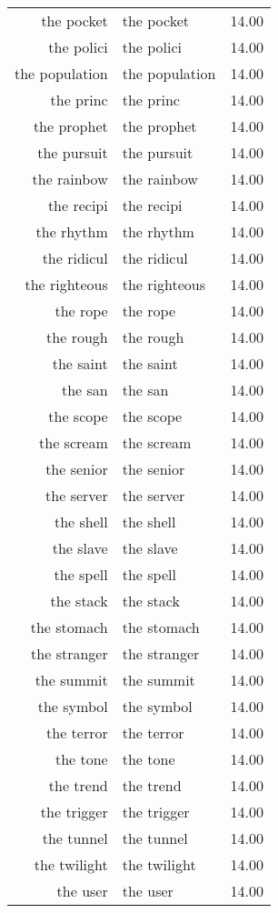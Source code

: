 \begin{table}[ht]
\begin{tabular}{rlr}
  the pocket & the pocket & 14.00 \\ 
  the polici & the polici & 14.00 \\ 
  the population & the population & 14.00 \\ 
  the princ & the princ & 14.00 \\ 
  the prophet & the prophet & 14.00 \\ 
  the pursuit & the pursuit & 14.00 \\ 
  the rainbow & the rainbow & 14.00 \\ 
  the recipi & the recipi & 14.00 \\ 
  the rhythm & the rhythm & 14.00 \\ 
  the ridicul & the ridicul & 14.00 \\ 
  the righteous & the righteous & 14.00 \\ 
  the rope & the rope & 14.00 \\ 
  the rough & the rough & 14.00 \\ 
  the saint & the saint & 14.00 \\ 
  the san & the san & 14.00 \\ 
  the scope & the scope & 14.00 \\ 
  the scream & the scream & 14.00 \\ 
  the senior & the senior & 14.00 \\ 
  the server & the server & 14.00 \\ 
  the shell & the shell & 14.00 \\ 
  the slave & the slave & 14.00 \\ 
  the spell & the spell & 14.00 \\ 
  the stack & the stack & 14.00 \\ 
  the stomach & the stomach & 14.00 \\ 
  the stranger & the stranger & 14.00 \\ 
  the summit & the summit & 14.00 \\ 
  the symbol & the symbol & 14.00 \\ 
  the terror & the terror & 14.00 \\ 
  the tone & the tone & 14.00 \\ 
  the trend & the trend & 14.00 \\ 
  the trigger & the trigger & 14.00 \\ 
  the tunnel & the tunnel & 14.00 \\ 
  the twilight & the twilight & 14.00 \\ 
  the user & the user & 14.00 \\ 

\end{tabular}
\end{table}
